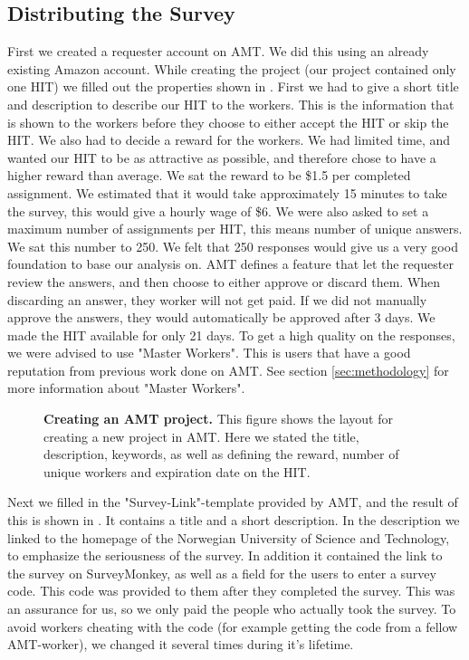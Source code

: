 \subsection{Distributing the Survey}
First we created a requester account on AMT. We did this using an already existing Amazon account. While creating the project (our project contained only one HIT) we filled out the properties shown in . First we had to give a short title and description to describe our HIT to the workers. This is the information that is shown to the workers before they choose to either accept the HIT or skip the HIT. We also had to decide a reward for the workers. We had limited time, and wanted our HIT to be as attractive as possible, and therefore chose to have a higher reward than average. We sat the reward to be \$1.5 per completed assignment. We estimated that it would take approximately 15 minutes to take the survey, this would give a hourly wage of \$6. We were also asked to set a maximum number of assignments per HIT, this means number of unique answers. We sat this number to 250. We felt that 250 responses would give us a very good foundation to base our analysis on. AMT defines a feature that let the requester review the answers, and then choose to either approve or discard them. When discarding an answer, they worker will not get paid. If we did not manually approve the answers, they would automatically be approved after 3 days. We made the HIT available for only 21 days. To get a high quality on the responses, we were advised to use "Master Workers". This is users that have a good reputation from previous work done on AMT. See section \ref{sec:methodology} for more information about "Master Workers". 

\begin{figure}[h!]
\centering
{}
\caption[Creating an AMT project]{\textbf{Creating an AMT project.} This figure shows the layout for creating a new project in AMT. Here we stated the title, description, keywords, as well as defining the reward, number of unique workers and expiration date on the HIT.} 
\label{fig:amtedit}
\end{figure}

Next we filled in the "Survey-Link"-template provided by AMT, and the result of this is shown in . It contains a title and a short description. In the description we linked to the homepage of the Norwegian University of Science and Technology, to emphasize the seriousness of the survey. In addition it contained the link to the survey on SurveyMonkey, as well as a field for the users to enter a survey code. This code was provided to them after they completed the survey. This was an assurance for us, so we only paid the people who actually took the survey. To avoid workers cheating with the code (for example getting the code from a fellow AMT-worker), we changed it several times during it's lifetime. 

